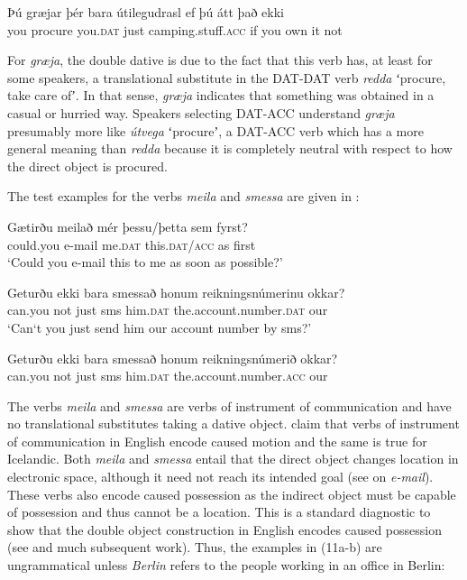 \documentclass[output=paper,modfonts,nonflat,colorlinks,citecolor=brown]{langsci/langscibook}
\begin{document}
{ 
\ex
\gll   Þú  græjar  þér  bara  útilegudrasl  ef  þú  átt  það  ekki\\
 you  procure  you.\textsc{dat}  just  camping.stuff.\textsc{acc}  if  you  own  it  not\\
\z
\z

For \textit{græja}, the double dative is due to the fact that this verb has, at least for some speakers, a translational substitute in the DAT-DAT verb \textit{redda} ʻprocure, take care ofʼ. In that sense, \textit{græja} indicates that something was obtained in a casual or hurried way. Speakers selecting DAT-ACC understand \textit{græja} presumably more like \textit{útvega} ʻprocureʼ, a DAT-ACC verb which has a more general meaning than \textit{redda} because it is completely neutral with respect to how the direct object is procured.

The test examples for the verbs \textit{meila} and \textit{smessa} are given in :

\ea%
    \label{ex:jonsson:10}  
\ea
\gll  Gætirðu  meilað  mér  þessu/þetta  sem  fyrst?\\
   could.you  e-mail  me.\textsc{dat}  this.\textsc{dat/acc}  as  first\\
\glt `Could you e-mail this to me as soon as possible?' 

\ex
\gll   Geturðu  ekki  bara  smessað  honum  reikningsnúmerinu  okkar?\\
 can.you  not  just  sms  him.\textsc{dat}  the.account.number.\textsc{dat}  our\\
\glt `Can‘t you just send him our account number by sms?' 

\ex
\gll   Geturðu  ekki  bara  smessað  honum  reikningsnúmerið  okkar?\\
 can.you  not  just  sms  him.\textsc{dat}  the.account.number.\textsc{acc}  our\\
\z
\z
 
The verbs \textit{meila} and \textit{smessa} are verbs of instrument of communication and have no translational substitutes taking a dative object.  \citet{RappaportHovavLevin2008} claim that verbs of instrument of communication in English encode caused motion and the same is true for Icelandic. Both \textit{meila} and \textit{smessa} entail that the direct object changes location in electronic space, although it need not reach its intended goal (see \citealt{Beavers2011} on \textit{e-mail}). These verbs also encode caused possession as the indirect object must be capable of possession and thus cannot be a location. This is a standard diagnostic to show that the double object construction in English encodes caused possession (see \citealt{Green1974} and much subsequent work). Thus, the examples in (11a-b) are ungrammatical unless \textit{Berlin} refers to the people working in an office in Berlin: 

}
\end{document}
